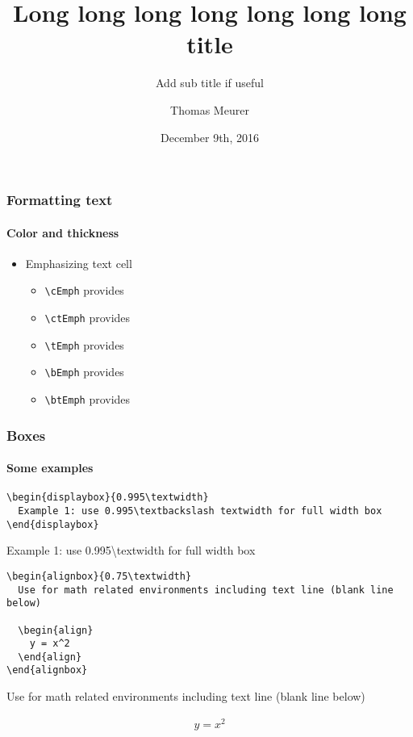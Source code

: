 \documentclass[10pt,t,aspectratio=1610]{beamer}
\title{Long long long long long long long title}
\subtitle{Add sub title if useful}
\author[T. Meurer]{Thomas Meurer}
\institute[ACON]{Meeting Name, Place (Country)}
\date{December 9th, 2016}
\begin{document}

\begin{frame}[plain]
  \titlepage
\end{frame}


\begin{frame}
  \frametitle{Formatting text}
  \framesubtitle{Color and thickness}

  \begin{itemize}
  \item Emphasizing text  cell
    \begin{itemize}
    \item \texttt{\textbackslash cEmph} provides 
    \item \texttt{\textbackslash ctEmph} provides 
    \item \texttt{\textbackslash tEmph} provides 
    \item \texttt{\textbackslash bEmph} provides 
    \item \texttt{\textbackslash btEmph} provides 
    \end{itemize}
  \end{itemize}  
\end{frame}


\begin{frame}[fragile]
  \frametitle{Boxes}
  \framesubtitle{Some examples}

\begin{verbatim}
\begin{displaybox}{0.995\textwidth}
  Example 1: use 0.995\textbackslash textwidth for full width box  
\end{displaybox}
\end{verbatim}
  
  \begin{displaybox}{0.995\textwidth}
    Example 1: use 0.995\textbackslash textwidth for full width box 
  \end{displaybox}
  
\begin{verbatim}
\begin{alignbox}{0.75\textwidth} 
  Use for math related environments including text line (blank line below)

  \begin{align}
    y = x^2
  \end{align}
\end{alignbox}
\end{verbatim}
  
  \begin{alignbox}{0.75\textwidth}
    Use for math related environments including text line (blank line below)
    
    \begin{align}
      y = x^2
    \end{align}
  \end{alignbox}
\end{frame}
\end{document}
